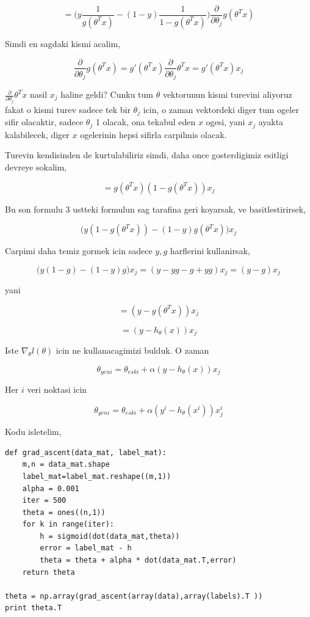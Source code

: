 \documentclass[12pt,fleqn]{article}\usepackage{../common}
\begin{document}
$$ 
= \big(
y 
\frac{1}{g(\theta^Tx)} 
-
(1-y) 
\frac{1}{1-g(\theta^Tx)} 
\big)
\frac{\partial }{\partial \theta_j}g(\theta^Tx)
$$

Simdi en sagdaki kismi acalim,

$$ 
\frac{\partial }{\partial \theta_j}g(\theta^Tx) 
= g'(\theta^Tx) \frac{\partial }{\partial \theta_j} \theta^Tx 
= g'(\theta^Tx) x_j 
 $$

$\frac{\partial }{\partial \theta_j} \theta^Tx$ nasil $x_j$ haline
geldi?  Cunku tum $\theta$ vektorunun kismi turevini aliyoruz fakat o
kismi turev sadece tek bir $\theta_j$ icin, o zaman vektordeki diger
tum ogeler sifir olacaktir, sadece $\theta_j$ 1 olacak, ona tekabul
eden $x$ ogesi, yani $x_j$ ayakta kalabilecek, diger $x$ ogelerinin
hepsi sifirla carpilmis olacak.

Turevin kendisinden de kurtulabiliriz simdi, daha once gosterdigimiz esitligi
devreye sokalim,

$$ 
= g(\theta^Tx)(1-g(\theta^Tx)) x_j 
$$

Bu son formulu 3 ustteki formulun sag tarafina geri koyarsak, ve
basitlestirirsek,

$$
\big(
y(1-g(\theta^Tx)) - (1-y)g(\theta^T x)
\big) x_j
 $$

Carpimi daha temiz gormek icin sadece $y,g$ harflerini kullanirsak,

$$
\big(y(1-g) - (1-y)g \big) x_j =
(y - yg - g + yg)x_j = (y - g)x_j
 $$

yani

$$
= (y - g(\theta^Tx))x_j
$$

$$
= (y - h_\theta(x))x_j
$$

Iste $\nabla_\theta l(\theta)$ icin ne kullanacagimizi bulduk. O zaman

$$ \theta_{yeni} = \theta_{eski} + \alpha (y - h_\theta(x))x_j $$

Her $i$ veri noktasi icin

$$ \theta_{yeni} = \theta_{eski} + \alpha (y^{i} - h_\theta(x^{i}))x^{i}_j $$

Kodu isletelim,

\begin{verbatim}
def grad_ascent(data_mat, label_mat):
    m,n = data_mat.shape
    label_mat=label_mat.reshape((m,1))
    alpha = 0.001
    iter = 500
    theta = ones((n,1))
    for k in range(iter):   
        h = sigmoid(dot(data_mat,theta))
        error = label_mat - h
        theta = theta + alpha * dot(data_mat.T,error) 
    return theta

theta = np.array(grad_ascent(array(data),array(labels).T ))
print theta.T
\end{verbatim}
\end{document}
